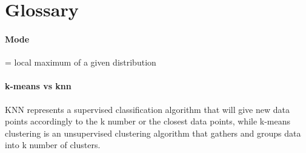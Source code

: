 \section{Glossary}
\paragraph{Mode} = local maximum of a given distribution
\paragraph{k-means vs knn}   KNN represents a supervised classification algorithm that will give new data points accordingly to the k number or the closest data points,
while k-means clustering is an unsupervised clustering algorithm that gathers and groups data into k number of clusters.